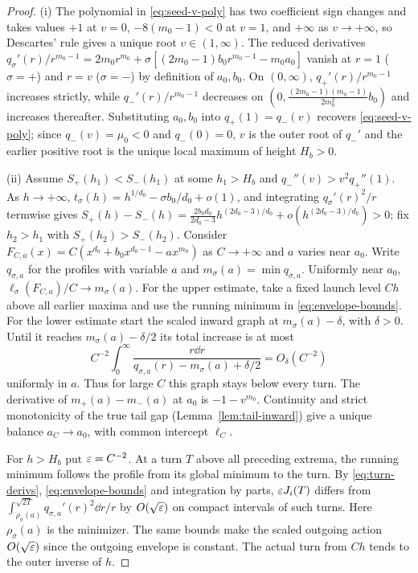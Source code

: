 \begin{proof}
(i) The polynomial in \eqref{eq:seed-v-poly} has two coefficient sign changes and takes values $+1$ at
$v=0$, $-8(m_0-1)<0$ at $v=1$, and $+\infty$ as $v\to+\infty$, so Descartes' rule gives a unique root
$v\in(1,\infty)$. The reduced derivatives $q_\sigma'(r)/r^{m_0-1}=2m_0 r^{m_0}+\sigma[(2m_0-1)b_0
r^{m_0-1}-m_0 a_0]$ vanish at $r=1$ ($\sigma=+$) and $r=v$ ($\sigma=-$) by definition of $a_0,b_0$. On
$(0,\infty)$, $q_+'(r)/r^{m_0-1}$ increases strictly, while $q_-'(r)/r^{m_0-1}$ decreases on
$(0,\frac{(2m_0-1)(m_0-1)}{2m_0^2}b_0)$ and increases thereafter. Substituting $a_0,b_0$ into
$q_+(1)=q_-(v)$ recovers \eqref{eq:seed-v-poly}; since $q_-(v)=\mu_0<0$ and $q_-(0)=0$, $v$ is the
outer root of $q_-'$ and the earlier positive root is the unique local maximum of height $H_b>0$.

(ii) Assume $S_+(h_1)<S_-(h_1)$ at some $h_1>H_b$ and $q_-''(v)>v^2 q_+''(1)$. As $h\to+\infty$,
$t_\sigma(h)=h^{1/d_0}-\sigma b_0/d_0+o(1)$, and integrating $q_\sigma'(r)^2/r$ termwise gives
$S_+(h)-S_-(h)=\frac{2b_0 d_0}{2d_0-3}h^{(2d_0-3)/d_0}+o(h^{(2d_0-3)/d_0})>0$; fix $h_2>h_1$ with
$S_+(h_2)>S_-(h_2)$. Consider $F_{C,a}(x)=C(x^{d_0}+b_0 x^{d_0-1}-a x^{m_0})$ as $C\to+\infty$ and $a$
varies near $a_0$. Write $q_{\sigma,a}$ for the profiles with variable $a$ and
$m_\sigma(a)=\min q_{\sigma,a}$. Uniformly near $a_0$,
$\ell_\sigma(F_{C,a})/C\to m_\sigma(a)$. For the upper estimate, take a
fixed launch level $Ch$ above all earlier maxima and use the running
minimum in \eqref{eq:envelope-bounds}. For the lower estimate start the
scaled inward graph at $m_\sigma(a)-\delta$, with $\delta>0$. Until it
reaches $m_\sigma(a)-\delta/2$ its total increase is at most
\[
 C^{-2}\int_0^\infty
  \frac{r\dd r}{q_{\sigma,a}(r)-m_\sigma(a)+\delta/2}=O_\delta(C^{-2})
\]
uniformly in $a$. Thus for large $C$ this graph stays below every turn.
The derivative of $m_+(a)-m_-(a)$ at $a_0$ is $-1-v^{m_0}$. Continuity
and strict monotonicity of the true tail gap (Lemma~\ref{lem:tail-inward})
give a unique balance $a_C\to a_0$, with common intercept $\ell_C$.

For $h>H_b$ put $\varepsilon=C^{-2}$. At a turn $T$ above all preceding
extrema, the running minimum follows the profile from its global
minimum to the turn. By \eqref{eq:turn-derivs}, \eqref{eq:envelope-bounds}
and integration by parts, $\varepsilon J_i(T)$ differs from
$\int_{\rho_\sigma(a)}^{\sqrt{2T}}q_{\sigma,a}'(r)^2\dd r/r$ by
$O(\sqrt{\varepsilon})$ on compact intervals of such turns. Here
$\rho_\sigma(a)$ is the minimizer. The same bounds make the scaled
outgoing action $O(\sqrt{\varepsilon})$ since the outgoing envelope is constant.
The actual turn from $Ch$ tends to the outer inverse of $h$.


\end{proof}
